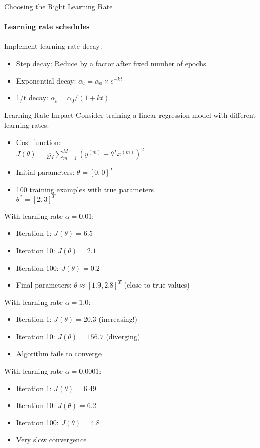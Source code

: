 \begin{KR}{Choosing the Right Learning Rate}
\paragraph{Learning rate schedules}
Implement learning rate decay:
\begin{itemize}
    \item Step decay: Reduce by a factor after fixed number of epochs
    \item Exponential decay: $\alpha_t = \alpha_0 \times e^{-kt}$
    \item 1/t decay: $\alpha_t = \alpha_0 / (1 + kt)$
\end{itemize}
\end{KR}

\begin{example2}{Learning Rate Impact}
Consider training a linear regression model with different learning rates:
\begin{itemize}
    \item Cost function:\\ $J(\theta) = \frac{1}{2M}\sum_{m=1}^{M}(y^{(m)} - \theta^T x^{(m)})^2$
    \item Initial parameters: $\theta = [0, 0]^T$
    \item 100 training examples with true parameters \\$\theta^* = [2, 3]^T$
\end{itemize}
\tcblower
With learning rate $\alpha = 0.01$:
\begin{itemize}
    \item Iteration 1: $J(\theta) = 6.5$
    \item Iteration 10: $J(\theta) = 2.1$
    \item Iteration 100: $J(\theta) = 0.2$
    \item Final parameters: $\theta \approx [1.9, 2.8]^T$ (close to true values)
\end{itemize}

With learning rate $\alpha = 1.0$:
\begin{itemize}
    \item Iteration 1: $J(\theta) = 20.3$ (increasing!)
    \item Iteration 10: $J(\theta) = 156.7$ (diverging)
    \item Algorithm fails to converge
\end{itemize}

With learning rate $\alpha = 0.0001$:
\begin{itemize}
    \item Iteration 1: $J(\theta) = 6.49$
    \item Iteration 10: $J(\theta) = 6.2$
    \item Iteration 100: $J(\theta) = 4.8$
    \item Very slow convergence
\end{itemize}
\end{example2}

